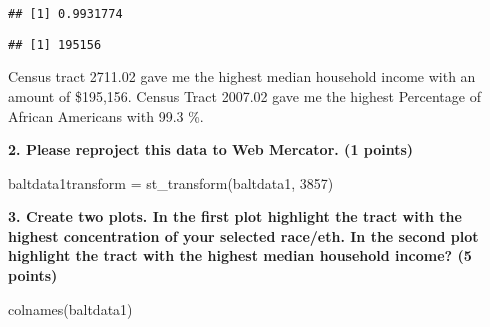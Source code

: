\documentclass[
]{article}
\newenvironment{Shaded}{\begin{snugshade}}{\end{snugshade}}
\newcommand{\DecValTok}[1]{\textcolor[rgb]{0.00,0.00,0.81}{#1}}
\newcommand{\FunctionTok}[1]{\textcolor[rgb]{0.00,0.00,0.00}{#1}}
\newcommand{\NormalTok}[1]{#1}
\newcommand{\OtherTok}[1]{\textcolor[rgb]{0.56,0.35,0.01}{#1}}
\newcommand{\SpecialCharTok}[1]{\textcolor[rgb]{0.00,0.00,0.00}{#1}}
\begin{document}
\begin{Shaded}
\end{Shaded}

\begin{verbatim}
## [1] 0.9931774
\end{verbatim}

\begin{Shaded}
\end{Shaded}

\begin{verbatim}
## [1] 195156
\end{verbatim}

Census tract 2711.02 gave me the highest median household income with an
amount of \$195,156. Census Tract 2007.02 gave me the highest Percentage
of African Americans with 99.3 \%.

\textbf{2. Please reproject this data to Web Mercator. (1 points)}

\begin{Shaded}
\begin{Highlighting}[]
\NormalTok{baltdata1transform }\OtherTok{=} \FunctionTok{st\_transform}\NormalTok{(baltdata1, }\DecValTok{3857}\NormalTok{)}
\end{Highlighting}
\end{Shaded}

\textbf{3. Create two plots. In the first plot highlight the tract with
the highest concentration of your selected race/eth. In the second plot
highlight the tract with the highest median household income? (5
points)}

\begin{Shaded}
\begin{Highlighting}[]
\FunctionTok{colnames}\NormalTok{(baltdata1)}
\end{Highlighting}
\end{Shaded}
\end{document}
